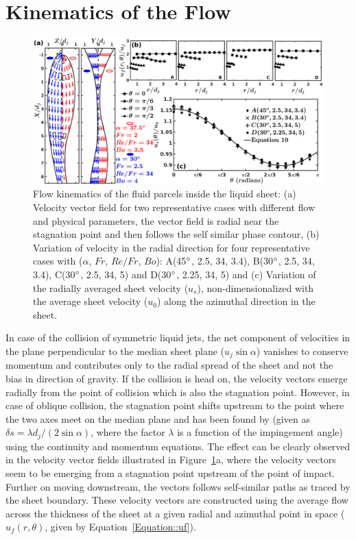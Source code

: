 \documentclass[%
aip,
sd,%
amsmath,amssymb,
preprint,%
author-year,%
]{revtex4-1}
\begin{document}
\section{Kinematics of the Flow}
\begin{figure}
	\centering
	\includegraphics[width=\linewidth]{velocityVectors}
	\caption{Flow kinematics of the fluid parcels inside the liquid sheet: (a) Velocity vector field for two representative cases with different flow and physical parameters, the vector field is radial near the stagnation point and then follows the self similar phase contour, (b) Variation of velocity in the radial direction for four representative cases with ($\alpha$, $Fr$, $Re/Fr$, $Bo$): A(45$\degree$, 2.5, 34, 3.4), B(30$\degree$, 2.5, 34, 3.4), C(30$\degree$, 2.5, 34, 5) and D(30$\degree$, 2.25, 34, 5) and (c) Variation of the radially averaged sheet velocity ($u_s$), non-dimensionalized with the average sheet velocity ($u_0$) along the azimuthal direction in the sheet.}
	\label{Figure::velocityVectors}
\end{figure}
In case of the collision of symmetric liquid jets, the net component of velocities in the plane perpendicular to the median sheet plane ($u_j\sin\alpha$) vanishes to conserve momentum and contributes only to the radial spread of the sheet and not the bias in direction of gravity. If the collision is head on, the velocity vectors emerge radially from the point of collision which is also the stagnation point. However, in case of oblique collision, the stagnation point shifts upstream to the point where the two axes meet on the median plane \citep{choo2007effect,yang2014liquid} and has been found by \cite{inamura2014effect} (given as $\delta s = \lambda d_j/(2\sin\alpha)$, where the factor $\lambda$ is a function of the impingement angle) using the continuity and momentum equations. The effect can be clearly observed in the velocity vector fields illustrated in Figure~\ref{Figure::velocityVectors}a, where the velocity vectors seem to be emerging from a stagnation point upstream of the point of impact. Further on moving downstream, the vectors follows self-similar paths as traced by the sheet boundary. These velocity vectors are constructed using the average flow across the thickness of the sheet at a given radial and azimuthal point in space ($u_f(r,\theta)$, given by Equation~\ref{Equation::uf}). 
\end{document}
